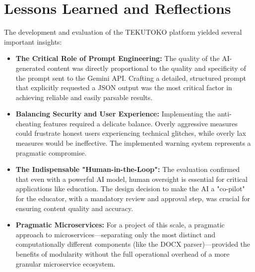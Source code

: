\section{Lessons Learned and Reflections}
\label{sec:discussion-lessons}
The development and evaluation of the TEKUTOKO platform yielded several important insights:
\begin{itemize}
    \item \textbf{The Critical Role of Prompt Engineering:} The quality of the AI-generated content was directly proportional to the quality and specificity of the prompt sent to the Gemini API. Crafting a detailed, structured prompt that explicitly requested a JSON output was the most critical factor in achieving reliable and easily parsable results.
    \item \textbf{Balancing Security and User Experience:} Implementing the anti-cheating features required a delicate balance. Overly aggressive measures could frustrate honest users experiencing technical glitches, while overly lax measures would be ineffective. The implemented warning system represents a pragmatic compromise.
    \item \textbf{The Indispensable "Human-in-the-Loop":} The evaluation confirmed that even with a powerful AI model, human oversight is essential for critical applications like education. The design decision to make the AI a "co-pilot" for the educator, with a mandatory review and approval step, was crucial for ensuring content quality and accuracy.
    \item \textbf{Pragmatic Microservices:} For a project of this scale, a pragmatic approach to microservices—separating only the most distinct and computationally different components (like the DOCX parser)—provided the benefits of modularity without the full operational overhead of a more granular microservice ecosystem.
\end{itemize}